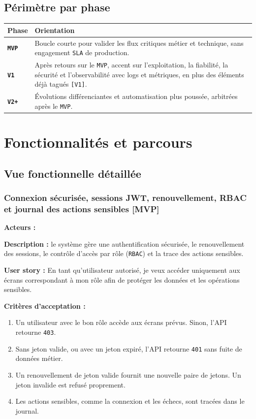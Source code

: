 \documentclass[11pt,a4paper]{scrreprt}
\newcommand{\code}[1]{\texttt{#1}}
\newcommand{\phase}[1]{\textbf{\textcolor{SplinAmber}{#1}}}
\newcommand{\actorbadge}[1]{\highlight{\code{#1}}}
\begin{document}
\section{Périmètre par phase}
\begin{table}[h]
\centering
\begin{tabularx}{\textwidth}{>{\bfseries}p{2.5cm}X}
\toprule
Phase & Orientation \\
\midrule
\code{MVP} & Boucle courte pour valider les flux critiques métier et technique, sans engagement \code{SLA} de production. \\
\code{V1} & Après retours sur le \code{MVP}, accent sur l'exploitation, la fiabilité, la sécurité et l'observabilité avec logs et métriques, en plus des éléments déjà tagués \code{[V1]}. \\
\code{V2+} & Évolutions différenciantes et automatisation plus poussée, arbitrées après le \code{MVP}. \\
\bottomrule
\end{tabularx}
\end{table}

\chapter{Fonctionnalités et parcours}

\section{Vue fonctionnelle détaillée}

\subsection{Connexion sécurisée, sessions JWT, renouvellement, RBAC et journal des actions sensibles \phase{[MVP]}}
\textbf{Acteurs :} \actorbadge{ADMIN} \actorbadge{SELLER} \actorbadge{CUSTOMER}

\textbf{Description :} le système gère une authentification sécurisée, le renouvellement des sessions, le contrôle d'accès par rôle (\code{RBAC}) et la trace des actions sensibles.

\textbf{User story :} En tant qu'utilisateur autorisé, je veux accéder uniquement aux écrans correspondant à mon rôle afin de protéger les données et les opérations sensibles.

\textbf{Critères d'acceptation :}
\begin{enumerate}
  \item Un utilisateur avec le bon rôle accède aux écrans prévus. Sinon, l'API retourne \code{403}.
  \item Sans jeton valide, ou avec un jeton expiré, l'API retourne \code{401} sans fuite de données métier.
  \item Un renouvellement de jeton valide fournit une nouvelle paire de jetons. Un jeton invalide est refusé proprement.
  \item Les actions sensibles, comme la connexion et les échecs, sont tracées dans le journal.
\end{enumerate}
\end{document}

